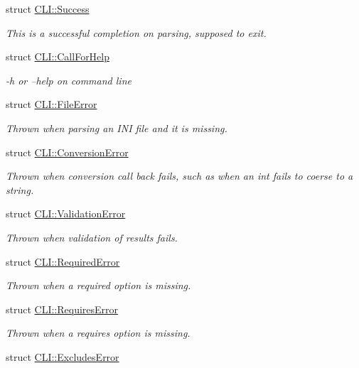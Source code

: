 \begin{DoxyCompactItemize}
struct \mbox{\hyperlink{struct_c_l_i_1_1_success}{C\+L\+I\+::\+Success}}
\begin{DoxyCompactList}\small\item\em This is a successful completion on parsing, supposed to exit. \end{DoxyCompactList}\item 
struct \mbox{\hyperlink{struct_c_l_i_1_1_call_for_help}{C\+L\+I\+::\+Call\+For\+Help}}
\begin{DoxyCompactList}\small\item\em -\/h or --help on command line \end{DoxyCompactList}\item 
struct \mbox{\hyperlink{struct_c_l_i_1_1_file_error}{C\+L\+I\+::\+File\+Error}}
\begin{DoxyCompactList}\small\item\em Thrown when parsing an I\+NI file and it is missing. \end{DoxyCompactList}\item 
struct \mbox{\hyperlink{struct_c_l_i_1_1_conversion_error}{C\+L\+I\+::\+Conversion\+Error}}
\begin{DoxyCompactList}\small\item\em Thrown when conversion call back fails, such as when an int fails to coerse to a string. \end{DoxyCompactList}\item 
struct \mbox{\hyperlink{struct_c_l_i_1_1_validation_error}{C\+L\+I\+::\+Validation\+Error}}
\begin{DoxyCompactList}\small\item\em Thrown when validation of results fails. \end{DoxyCompactList}\item 
struct \mbox{\hyperlink{struct_c_l_i_1_1_required_error}{C\+L\+I\+::\+Required\+Error}}
\begin{DoxyCompactList}\small\item\em Thrown when a required option is missing. \end{DoxyCompactList}\item 
struct \mbox{\hyperlink{struct_c_l_i_1_1_requires_error}{C\+L\+I\+::\+Requires\+Error}}
\begin{DoxyCompactList}\small\item\em Thrown when a requires option is missing. \end{DoxyCompactList}\item 
struct \mbox{\hyperlink{struct_c_l_i_1_1_excludes_error}{C\+L\+I\+::\+Excludes\+Error}}

\end{DoxyCompactItemize}
